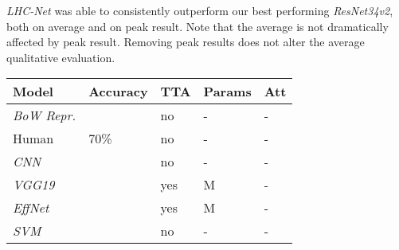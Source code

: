 \documentclass[fleqn,10pt]{SelfArx}
\begin{document}
\textit{LHC-Net} was able to consistently outperform our best performing \textit{ResNet34v2},  both on average and on peak result. Note that the average is not dramatically affected by peak result. Removing peak results does not alter the average qualitative evaluation. \begin{center}
\begin{tabular}{||p{2.2cm} | p{1.3cm} | p{0.7cm} | p{1.2cm} | p{0.8cm}||}  
\hline
\textbf{Model} & \textbf{Accuracy} & \textbf{TTA} & \textbf{Params} & \hspace{0.17cm}\textbf{Att}\\ 
\hline
\hline
\textit{BoW Repr.}\cite{FER2013}          & \hspace{0.15cm}               & \hspace{0.17cm}no  & \hspace{0.5cm}-           & \hspace{0.4cm}-\\
\hline
\hline
Human \cite{FER2013}                         & \hspace{0.4cm}70\%                      & \hspace{0.15cm}no  & \hspace{0.5cm}-           & \hspace{0.4cm}- \\
\hline
\hline
\textit{CNN}\cite{minaee2021deep}       & \hspace{0.15cm}               & \hspace{0.15cm}no   & \hspace{0.5cm}-          & \hspace{0.4cm}-\\
\hline
\hline
\textit{VGG19}\cite{resmaskingnet}       & \hspace{0.15cm}               & \hspace{0.12cm}yes   & \hspace{0.05cm}M & \hspace{0.4cm}-\\
\hline
\hline
\textit{EffNet}\cite{resmaskingnet}       & \hspace{0.15cm}               & \hspace{0.12cm}yes   & \hspace{0.12cm}M &\hspace{0.4cm}-\\
\hline
\hline
\textit{SVM}\cite{FER2013}                  & \hspace{0.15cm}               & \hspace{0.15cm}no   & \hspace{0.5cm}- & \hspace{0.4cm}-\\

\end{tabular}
\end{center}
\end{document}
